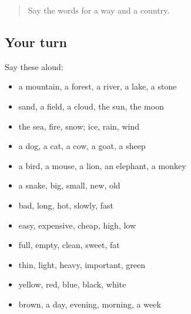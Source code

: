 \label{lesson:PA-R98-first-pass-animals-describing-words-and-time}



\begin{quote}
Say the words for a way and a country.
\end{quote}

\subsection*{Your turn}
Say these aloud:

\begin{itemize}
\raggedright
  \item a mountain, a forest, a river, a lake, a stone
  \item sand, a field, a cloud, the sun, the moon
  \item the sea, fire, snow; ice, rain, wind
  \item a dog, a cat, a cow, a goat, a sheep
  \item a bird, a mouse, a lion, an elephant, a monkey
  \item a snake, big, small, new, old
  \item bad, long, hot, slowly, fast
  \item easy, expensive, cheap, high, low
  \item full, empty, clean, sweet, fat
  \item thin, light, heavy, important, green
  \item yellow, red, blue, black, white
  \item brown, a day, evening, morning, a week
\end{itemize}

